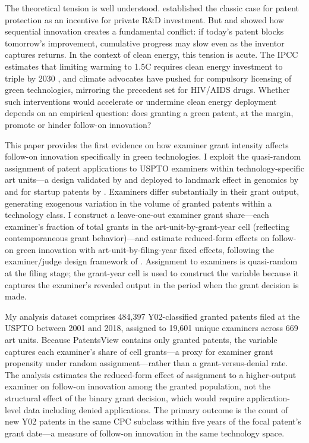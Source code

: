 \documentclass[12pt]{article}
\begin{document}
The theoretical tension is well understood. \citet{nordhaus1969} established the classic case for patent protection as an incentive for private R\&D investment. But \citet{scotchmer1991} and \citet{heller1998} showed how sequential innovation creates a fundamental conflict: if today's patent blocks tomorrow's improvement, cumulative progress may slow even as the inventor captures returns. In the context of clean energy, this tension is acute. The IPCC estimates that limiting warming to 1.5\textdegree C requires clean energy investment to triple by 2030 \citep{ipcc2023}, and climate advocates have pushed for compulsory licensing of green technologies, mirroring the precedent set for HIV/AIDS drugs. Whether such interventions would accelerate or undermine clean energy deployment depends on an empirical question: does granting a green patent, at the margin, promote or hinder follow-on innovation?

This paper provides the first evidence on how examiner grant intensity affects follow-on innovation specifically in green technologies. I exploit the quasi-random assignment of patent applications to USPTO examiners within technology-specific art units---a design validated by \citet{lemley2012} and deployed to landmark effect in genomics by \citet{sampat2019} and for startup patents by \citet{farremensa2020}. Examiners differ substantially in their grant output, generating exogenous variation in the volume of granted patents within a technology class. I construct a leave-one-out examiner grant share---each examiner's fraction of total grants in the art-unit-by-grant-year cell (reflecting contemporaneous grant behavior)---and estimate reduced-form effects on follow-on green innovation with art-unit-by-filing-year fixed effects, following the examiner/judge design framework of \citet{chyn2024}. Assignment to examiners is quasi-random at the filing stage; the grant-year cell is used to construct the variable because it captures the examiner's revealed output in the period when the grant decision is made.

My analysis dataset comprises 484,397 Y02-classified granted patents filed at the USPTO between 2001 and 2018, assigned to 19,601 unique examiners across 669 art units. Because PatentsView contains only granted patents, the variable captures each examiner's share of cell grants---a proxy for examiner grant propensity under random assignment---rather than a grant-versus-denial rate. The analysis estimates the reduced-form effect of assignment to a higher-output examiner on follow-on innovation among the granted population, not the structural effect of the binary grant decision, which would require application-level data including denied applications. The primary outcome is the count of new Y02 patents in the same CPC subclass within five years of the focal patent's grant date---a measure of follow-on innovation in the same technology space.
\end{document}
